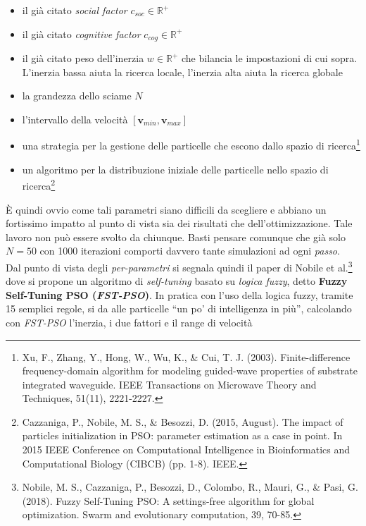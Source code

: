 \documentclass[a4paper,12pt, oneside]{book}
\begin{document}
\begin{itemize}
  \item il già citato \textit{social factor} $c_{soc}\in\mathbb{R}^{+}$
  \item il già citato \textit{cognitive factor} $c_{cog}\in\mathbb{R}^{+}$
  \item il già citato peso dell'inerzia $w\in\mathbb{R}^{+}$ che bilancia le
  impostazioni di cui sopra. L'inerzia bassa aiuta la ricerca locale, l'inerzia
  alta aiuta la ricerca globale 
  \item la grandezza dello sciame $N$
  \item l'intervallo della velocità $[\mathbf{v}_{min}, \mathbf{v}_{max}]$
  \item una strategia per la gestione delle particelle che escono dallo spazio
  di ricerca\footnote{Xu, F., Zhang, Y., Hong, W., Wu, K., \& Cui,
    T. J. (2003). Finite-difference frequency-domain algorithm for modeling
    guided-wave properties of substrate integrated waveguide. IEEE Transactions
    on Microwave Theory and Techniques, 51(11), 2221-2227.} 
  \item un algoritmo per la distribuzione iniziale delle particelle nello spazio
  di ricerca\footnote{Cazzaniga, P., Nobile, M. S., \& Besozzi, D. (2015,
    August). The impact of particles initialization in PSO: parameter estimation
    as a case in point. In 2015 IEEE Conference on Computational Intelligence in
    Bioinformatics and Computational Biology (CIBCB) (pp. 1-8). IEEE.} 
\end{itemize}
È quindi ovvio come tali parametri siano difficili da scegliere e abbiano un
fortissimo impatto al punto di vista sia dei risultati che
dell'ottimizzazione. Tale lavoro non può essere svolto da chiunque. Basti
pensare comunque che già solo $N=50$ con 1000 iterazioni comporti davvero tante
simulazioni ad ogni \textit{passo}.\\
Dal punto di vista degli \textit{per-parametri} si segnala quindi il paper di
Nobile et al.\footnote{Nobile, M. S., Cazzaniga, P., Besozzi, D., Colombo, R.,
  Mauri, G., \& Pasi, G. (2018). Fuzzy Self-Tuning PSO: A settings-free
  algorithm 
  for global optimization. Swarm and evolutionary computation, 39, 70-85.} dove
si propone un algoritmo di \textit{self-tuning} basato su \textit{logica fuzzy},
detto \textbf{Fuzzy Self-Tuning PSO (\textit{FST-PSO})}. In pratica con l'uso
della logica fuzzy, tramite 15 semplici regole, si da alle particelle ``un po'
di intelligenza in più'', 
calcolando con \textit{FST-PSO} l'inerzia, i due fattori e il range di velocità
\end{document}
